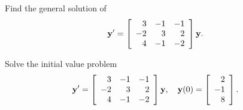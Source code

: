 \setcounter{example}{1}
\setcounter{equation}{11}
\begin{example}
  \label{example:10.4.2} \rm \mbox{}
  \newline
  \begin{alist}
    \item %
    Find the general solution of
    \begin{equation}
      \label{eq:10.4.12}{\bf y}'=\left[
      \begin{array}{rrr}
        3  & -1 & -1 \\
        -2 & 3  & 2  \\
        4  & -1 & -2
      \end{array}\right]{\bf y}.
    \end{equation}

    \item %
    Solve the initial value problem
    \begin{equation}
      \label{eq:10.4.13}{\bf y}'=\left[
      \begin{array}{rrr}
        3  & -1 & -1 \\
        -2 & 3  & 2  \\
        4  & -1 & -2
      \end{array}
      \right]{\bf y},\quad{\bf y}(0)=\left[
      \begin{array}{r}
        2  \\
        -1 \\
        8
      \end{array}\right].
    \end{equation}
  \end{alist}
\end{example}
\setcounter{equation}{13}
